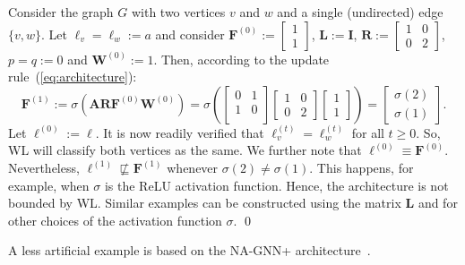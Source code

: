 \begin{example}\label{ex1}\normalfont
Consider the graph $G$ with two vertices $v$ and $w$ and a single (undirected) edge $\{v,w\}$. Let $\pmb{\ell}_v=\pmb{\ell}_w:=a$ and consider  $\mathbf{F}^{(0)}:=\left[\begin{smallmatrix}1\\1\end{smallmatrix}\right]$, $\mathbf{L}:=\mathbf{I}$,
 $\mathbf{R}:=\left[\begin{smallmatrix}1 & 0\\0& 2\end{smallmatrix}\right]$, $p=q:=0$ and $\mathbf{W}^{(0)}:=1$.
Then, according to the update rule~(\ref{eq:architecture}):
$$
\mathbf{F}^{(1)}:=\sigma\left(\mathbf{A}\mathbf{R}\mathbf{F}^{(0)}\mathbf{W}^{(0)}\right)=
\sigma\left(\begin{bmatrix}
0& 1 \\
1 & 0\\
\end{bmatrix}\begin{bmatrix}1 & 0\\0& 2\end{bmatrix}\begin{bmatrix}1\\1\end{bmatrix}\right)=\begin{bmatrix}\sigma(2)\\\sigma(1)\end{bmatrix}.
$$
Let 
$\pmb{\ell}^{(0)}:=\pmb{\ell}$.
It is now readily verified that $\pmb{\ell}^{(t)}_v=\pmb{\ell}^{(t)}_w$ for all $t\geq 0$. So, WL will classify both vertices as the same. We further note that  $\pmb{\ell}^{(0)}\equiv \mathbf{F}^{(0)}$. Nevertheless, $\pmb{\ell}^{(1)}\not\sqsubseteq \mathbf{F}^{(1)}$ whenever $\sigma(2)\neq\sigma(1)$. This happens, for example, when $\sigma$ is the ReLU activation function. Hence, the architecture is not bounded by WL. Similar examples can be constructed using the matrix $\mathbf{L}$  and for other choices of the activation function $\sigma$. \qed
\end{example}

A less artificial example is based on the NA-GNN+ architecture~\cite{kipf-loose}.

